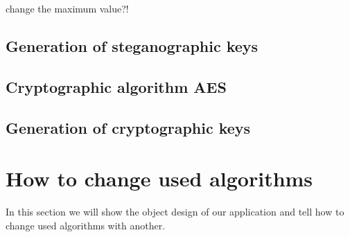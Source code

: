 \TODO change the maximum value?!

\subsection{Generation of steganographic keys}

\subsection{Cryptographic algorithm AES}

\subsection{Generation of cryptographic keys}

\section{How to change used algorithms}
In this section we will show the object design of our application
and tell how to change used algorithms with another.
